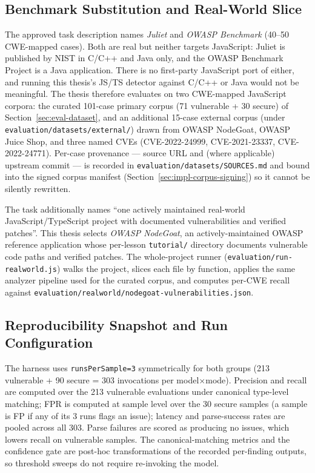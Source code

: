 \subsection{Benchmark Substitution and Real-World Slice}
\label{sec:eval-benchmark-substitution}
\label{sec:eval-realworld}

The approved task description names \emph{Juliet} and \emph{OWASP Benchmark} (40--50 CWE-mapped cases). Both are real but neither targets JavaScript: Juliet is published by NIST in C/C++ and Java only, and the OWASP Benchmark Project is a Java application. There is no first-party JavaScript port of either, and running this thesis's JS/TS detector against C/C++ or Java would not be meaningful. The thesis therefore evaluates on two CWE-mapped JavaScript corpora: the curated 101-case primary corpus (71 vulnerable + 30 secure) of Section~\ref{sec:eval-dataset}, and an additional 15-case external corpus (under \texttt{evaluation/datasets/external/}) drawn from OWASP NodeGoat, OWASP Juice Shop, and three named CVEs (CVE-2022-24999, CVE-2021-23337, CVE-2022-24771). Per-case provenance --- source URL and (where applicable) upstream commit --- is recorded in \texttt{evaluation/datasets/SOURCES.md} and bound into the signed corpus manifest (Section~\ref{sec:impl-corpus-signing}) so it cannot be silently rewritten.

The task additionally names ``one actively maintained real-world JavaScript/TypeScript project with documented vulnerabilities and verified patches''. This thesis selects \emph{OWASP NodeGoat}, an actively-maintained OWASP reference application whose per-lesson \texttt{tutorial/} directory documents vulnerable code paths and verified patches. The whole-project runner (\texttt{evaluation/run-realworld.js}) walks the project, slices each file by function, applies the same analyzer pipeline used for the curated corpus, and computes per-CWE recall against \texttt{evaluation/realworld/nodegoat-vulnerabilities.json}.

\subsection{Reproducibility Snapshot and Run Configuration}
\label{sec:eval-refined-config}
\label{sec:eval-container}

The harness uses \texttt{runsPerSample=3} symmetrically for both groups (213 vulnerable + 90 secure = 303 invocations per model$\times$mode). Precision and recall are computed over the 213 vulnerable evaluations under canonical type-level matching; FPR is computed at sample level over the 30 secure samples (a sample is FP if any of its 3 runs flags an issue); latency and parse-success rates are pooled across all 303. Parse failures are scored as producing no issues, which lowers recall on vulnerable samples. The canonical-matching metrics and the confidence gate are post-hoc transformations of the recorded per-finding outputs, so threshold sweeps do not require re-invoking the model.

